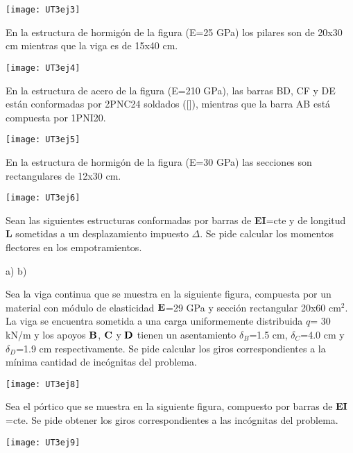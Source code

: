 \begin{center}
	\texttt{[image: UT3ej3]}
\end{center}

\ejercicio

En la estructura de hormigón de la figura (E=25 GPa) los pilares son de 20x30 cm mientras que la viga es de 15x40 cm. 

\begin{center}
	\texttt{[image: UT3ej4]}
\end{center}


\ejercicio

En la estructura de acero de la figura (E=210 GPa), las barras BD, CF y DE están conformadas por 2PNC24 soldados ([]), mientras que la barra AB está compuesta por 1PNI20. 


\begin{center}
	\texttt{[image: UT3ej5]}
\end{center}



\ejercicio 

En la estructura de hormigón de la figura (E=30 GPa) las secciones son rectangulares de 12x30 cm. 

\begin{center}
	\texttt{[image: UT3ej6]}
\end{center}


\ejercicio


Sean las siguientes estructuras conformadas por barras de \textbf{EI}=cte y de longitud \textbf{L} sometidas a un desplazamiento impuesto $\Delta$. Se pide calcular los momentos flectores en los empotramientos.


\begin{center}
	\def\svgwidth{0.45\textwidth}
	a) 
	\def\svgwidth{0.45\textwidth}
	b) 
\end{center}

\ejercicio

Sea la viga continua que se muestra en la siguiente figura, compuesta por un material con módulo de elasticidad $\bf E$=29 GPa y sección rectangular 20x60 cm$^2$. La viga se encuentra sometida a una carga uniformemente distribuida $q$= 30 kN/m y los apoyos $\bf B$, $\bf C$ y $\bf D$ tienen un asentamiento $\delta_B$=1.5 cm, $\delta_C$=4.0 cm y $\delta_D$=1.9 cm respectivamente. Se pide calcular los giros correspondientes a la mínima cantidad de incógnitas del problema.

\begin{center}
	\texttt{[image: UT3ej8]}
\end{center}

\clearpage
\ejercicio

Sea el pórtico que se muestra en la siguiente figura, compuesto por barras de $\bf EI$=cte. Se pide obtener los giros correspondientes a las incógnitas del problema.

\begin{center}
	\texttt{[image: UT3ej9]}
\end{center}

 
